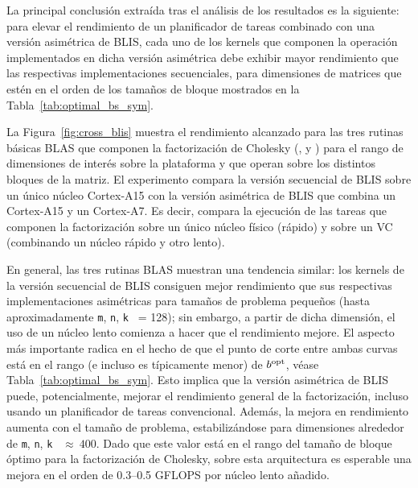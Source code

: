 La principal conclusión extraída tras el análisis de los resultados es la
siguiente: para elevar el rendimiento de un planificador de tareas
combinado con una versión asimétrica de BLIS, cada uno de los kernels que
componen la operación implementados en dicha versión asimétrica debe
exhibir mayor rendimiento que las respectivas implementaciones
secuenciales, para dimensiones de matrices que estén en el orden de los
tamaños de bloque mostrados en la Tabla~\ref{tab:optimal_bs_sym}.

La Figura~\ref{fig:cross_blis} muestra el rendimiento alcanzado para las
tres rutinas básicas BLAS que componen la factorización de Cholesky (\gemm,
\syrk y \trsm) para el rango de dimensiones de interés sobre la plataforma
\odroid y que operan sobre los distintos bloques de la matriz. El
experimento compara la versión secuencial de BLIS sobre un único núcleo
Cortex-A15 con la versión asimétrica de BLIS que combina un Cortex-A15 y un
Cortex-A7. Es decir, compara la ejecución de las tareas que componen la
factorización sobre un único núcleo físico (rápido) y sobre un VC
(combinando un núcleo rápido y otro lento).

En general, las tres rutinas BLAS muestran una tendencia similar: los
kernels de la versión secuencial de BLIS consiguen mejor rendimiento que
sus respectivas implementaciones asimétricas para tamaños de problema
pequeños (hasta aproximadamente {\tt m}, {\tt n}, {\tt k } = 128); sin
embargo, a partir de dicha dimensión, el uso de un núcleo lento comienza a
hacer que el rendimiento mejore.  El aspecto más importante radica en el
hecho de que el punto de corte entre ambas curvas está en el rango (e
incluso es típicamente menor) de $b^{\mbox{\rm \scriptsize opt}}$, véase
Tabla~\ref{tab:optimal_bs_sym}.  Esto implica que la versión asimétrica de
BLIS puede, potencialmente, mejorar el rendimiento general de la
factorización, incluso usando un planificador de tareas convencional.
Además, la mejora en rendimiento aumenta con el tamaño de problema,
estabilizándose para dimensiones alrededor de {\tt m}, {\tt n}, {\tt k }
$\approx~400$. Dado que este valor está en el rango del tamaño de bloque
óptimo para la factorización de Cholesky, sobre esta arquitectura es
esperable una mejora en el orden de 0.3--0.5 GFLOPS por núcleo lento
añadido.  





